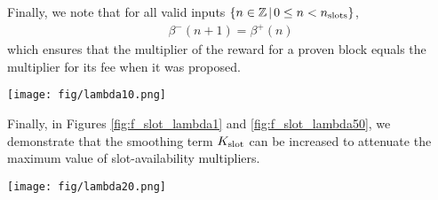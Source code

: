 Finally, we note that for all valid inputs $\{n\in \mathbb{Z} \hspace{0.02in}|\hspace{0.02in}  0 \leq n < n_\textnormal{slots} \}$,
\begin{align}
    \beta^-(n+1) = \beta^+(n)
\end{align}
which ensures that the multiplier of the reward for a proven block equals the multiplier for its fee when it was proposed.



\begin{Figure}
 \centering
 \texttt{[image: fig/lambda10.png]}
 \label{fig:f_slot_lambda1}
\end{Figure}

Finally, in Figures \ref{fig:f_slot_lambda1} and \ref{fig:f_slot_lambda50}, we demonstrate that the smoothing term $K_\textnormal{slot}$ can be increased to attenuate the maximum value of slot-availability multipliers.

\begin{Figure}
 \centering
 \texttt{[image: fig/lambda20.png]}
 \label{fig:f_slot_lambda50}

\end{Figure}

